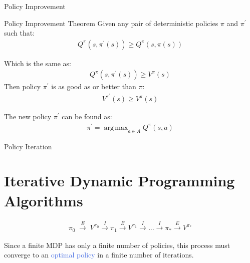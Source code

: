 \documentclass{beamer}
\DeclareMathOperator*{\argmax}{arg\,max}
\begin{document}
\begin{frame}{Policy Improvement}


\begin{block}{Policy Improvement Theorem}
Given any pair of deterministic policies $\pi$ and $\pi^{\prime}$ such that:
\begin{align*}
Q^{\pi}(s, \pi^{\prime}(s)) \geq Q^{\pi}(s, \pi(s))
\end{align*}

Which is the same as:
\begin{align*}
Q^{\pi}(s, \pi^{\prime}(s)) \geq V^{\pi}(s)
\end{align*}
Then policy $\pi^{\prime}$ is as good as or better than $\pi$:
\begin{align*}
    V^{\pi^{\prime}}(s) \geq V^{\pi}(s)
\end{align*}
\end{block}

\hspace{1mm}

The new policy $\pi^{\prime}$ can be found as:
\begin{align*}
    \pi^{\prime} = \argmax_{a \in A} Q^{\pi}(s,a)
\end{align*}

\end{frame}

\begin{frame}{Policy Iteration}
\section{Iterative Dynamic Programming Algorithms}

\begin{align*}
\pi_0 \; \overset{E}{\longrightarrow} \; V^{\pi_0} \overset{I}\longrightarrow \pi_1 \overset{E}\longrightarrow V^{\pi_1} \overset{I}\longrightarrow . . . \overset{I}\longrightarrow \pi_{*} \overset{E}\longrightarrow V^{\pi_*}
\end{align*}

Since a finite MDP has only a finite number of policies, this process must converge to an \textcolor{RoyalBlue}{optimal policy} in a finite number of iterations.

\end{frame}
\end{document}
